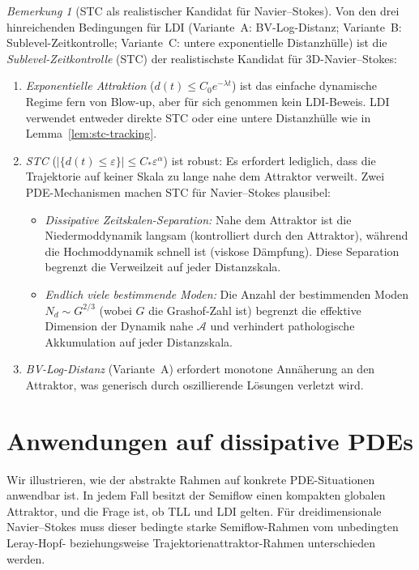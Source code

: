 \documentclass[12pt,a4paper]{article}
\theoremstyle{definition}
\theoremstyle{plain}
\theoremstyle{remark}
\newtheorem{remark}[definition]{Bemerkung}
\begin{document}
\begin{remark}[STC als realistischer Kandidat für Navier--Stokes]
\label{rem:stc-realistic}
Von den drei hinreichenden Bedingungen für LDI (Variante~A: BV-Log-Distanz; Variante~B: Sublevel-Zeitkontrolle; Variante~C: untere exponentielle Distanzhülle) ist die \emph{Sublevel-Zeitkontrolle} (STC) der realistischste Kandidat für 3D-Navier--Stokes:
\begin{enumerate}
\item \emph{Exponentielle Attraktion} ($d(t) \leq C_0 e^{-\lambda t}$) ist das einfache dynamische Regime fern von Blow-up, aber für sich genommen kein LDI-Beweis. LDI verwendet entweder direkte STC oder eine untere Distanzhülle wie in Lemma~\ref{lem:stc-tracking}.
\item \emph{STC} ($|\{d(t) \leq \varepsilon\}| \leq C_* \varepsilon^\alpha$) ist robust: Es erfordert lediglich, dass die Trajektorie auf keiner Skala zu lange nahe dem Attraktor verweilt. Zwei PDE-Mechanismen machen STC für Navier--Stokes plausibel:
\begin{itemize}
\item \emph{Dissipative Zeitskalen-Separation:} Nahe dem Attraktor ist die Niedermoddynamik langsam (kontrolliert durch den Attraktor), während die Hochmoddynamik schnell ist (viskose Dämpfung). Diese Separation begrenzt die Verweilzeit auf jeder Distanzskala.
\item \emph{Endlich viele bestimmende Moden:} Die Anzahl der bestimmenden Moden $N_d \sim G^{2/3}$ (wobei $G$ die Grashof-Zahl ist) begrenzt die effektive Dimension der Dynamik nahe $\mathcal{A}$ und verhindert pathologische Akkumulation auf jeder Distanzskala.
\end{itemize}
\item \emph{BV-Log-Distanz} (Variante~A) erfordert monotone Annäherung an den Attraktor, was generisch durch oszillierende Lösungen verletzt wird.
\end{enumerate}
\end{remark}


\section{Anwendungen auf dissipative PDEs}
\label{sec:applications}

Wir illustrieren, wie der abstrakte Rahmen auf konkrete
PDE-Situationen anwendbar ist.  In jedem Fall besitzt der Semiflow
einen kompakten globalen Attraktor, und die Frage ist, ob TLL und
LDI gelten. Für dreidimensionale Navier--Stokes muss dieser bedingte
starke Semiflow-Rahmen vom unbedingten Leray-Hopf- beziehungsweise
Trajektorienattraktor-Rahmen unterschieden werden.
\end{document}

